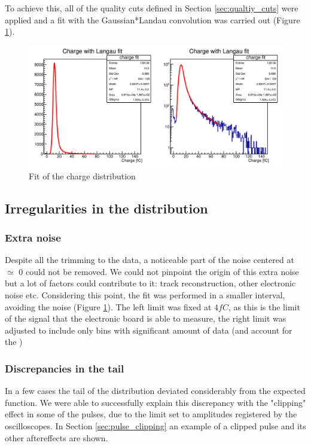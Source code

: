 To achieve this, all of the quality cuts defined in Section \ref{sec:qualtiy_cuts} were applied and a fit with the Gaussian*Landau convolution was carried out (Figure \ref{fig:charge_ROOT_fit}). 

\begin{figure}[!ht]
    \centering
    \includegraphics[width=1\textwidth]{Images/charge_plots/charge_data_all_cuts_401_S1_3_Charge_fit_ROOT_double_plot.png}
    \caption{Fit of the charge distribution}
    \label{fig:charge_ROOT_fit}
\end{figure}

\subsection{Irregularities in the distribution}

\subsubsection{Extra noise}
Despite all the trimming to the data, a noticeable part of the noise centered at $\simeq$ 0 could not be removed. We could not pinpoint the origin of this extra noise but a lot of factors could contribute to it: track reconstruction, other electronic noise etc.
Considering this point, the fit was performed in a smaller interval, avoiding the noise (Figure \ref{fig:charge_ROOT_fit}). The left limit was fixed at $4\si{fC}$, as this is the limit of the signal that the electronic board is able to measure, the right limit was adjusted to include only bins with significant amount of data (and account for the )

\subsubsection{Discrepancies in the tail}\label{subsec:tail_discrepancies}
In a few cases the tail of the distribution deviated considerably from the expected function. We were able to successfully explain this discrepancy with the "clipping" effect in some of the pulses, due to the limit set to amplitudes registered by the oscilloscopes.
In Section \ref{sec:pulse_clipping} an example of a clipped pulse and its other aftereffects are shown.

